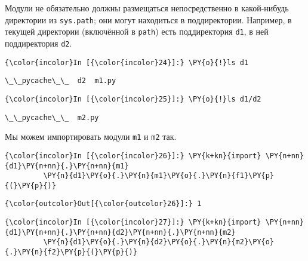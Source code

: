     Модули не обязательно должны размещаться непосредственно в какой-нибудь
директории из \texttt{sys.path}; они могут находиться в поддиректории.
Например, в текущей директории (включённой в \texttt{path}) есть
поддиректория \texttt{d1}, в ней поддиректория \texttt{d2}.

    \begin{Verbatim}[commandchars=\\\{\}]
{\color{incolor}In [{\color{incolor}24}]:} \PY{o}{!}ls d1
\end{Verbatim}

    \begin{Verbatim}[commandchars=\\\{\}]
\_\_pycache\_\_  d2  m1.py

    \end{Verbatim}

    \begin{Verbatim}[commandchars=\\\{\}]
{\color{incolor}In [{\color{incolor}25}]:} \PY{o}{!}ls d1/d2
\end{Verbatim}

    \begin{Verbatim}[commandchars=\\\{\}]
\_\_pycache\_\_  m2.py

    \end{Verbatim}

    Мы можем импортировать модули \texttt{m1} и \texttt{m2} так.

    \begin{Verbatim}[commandchars=\\\{\}]
{\color{incolor}In [{\color{incolor}26}]:} \PY{k+kn}{import} \PY{n+nn}{d1}\PY{n+nn}{.}\PY{n+nn}{m1}
         \PY{n}{d1}\PY{o}{.}\PY{n}{m1}\PY{o}{.}\PY{n}{f1}\PY{p}{(}\PY{p}{)}
\end{Verbatim}

            \begin{Verbatim}[commandchars=\\\{\}]
{\color{outcolor}Out[{\color{outcolor}26}]:} 1
\end{Verbatim}
        
    \begin{Verbatim}[commandchars=\\\{\}]
{\color{incolor}In [{\color{incolor}27}]:} \PY{k+kn}{import} \PY{n+nn}{d1}\PY{n+nn}{.}\PY{n+nn}{d2}\PY{n+nn}{.}\PY{n+nn}{m2}
         \PY{n}{d1}\PY{o}{.}\PY{n}{d2}\PY{o}{.}\PY{n}{m2}\PY{o}{.}\PY{n}{f2}\PY{p}{(}\PY{p}{)}
\end{Verbatim}

